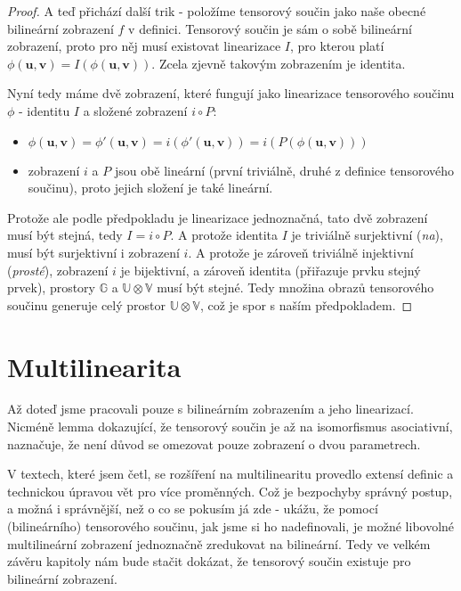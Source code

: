 \documentclass[a5paper,12pt]{amsbook}
\theoremstyle{definition}
\newcommand{\myvec}[1]{\mathbf{#1}}
\newcommand{\myspace}[1]{\mathbb{#1}}
\begin{document}
\begin{proof}
A teď přichází další trik - položíme tensorový součin jako naše obecné bilineární zobrazení
$f$ v definici. Tensorový součin je sám o sobě bilineární zobrazení, proto pro něj musí existovat
linearizace $I$, pro kterou platí $\phi(\myvec{u}, \myvec{v}) = I(\phi(\myvec{u}, \myvec{v}))$.
Zcela zjevně takovým zobrazením je identita.

Nyní tedy máme dvě zobrazení, které fungují jako linearizace tensorového součinu $\phi$ - identitu
$I$ a složené zobrazení $i \circ P$:
\begin{itemize}
\item $\phi(\myvec{u}, \myvec{v}) = \phi'(\myvec{u}, \myvec{v}) = i(\phi'(\myvec{u}, \myvec{v}))
    = i(P(\phi(\myvec{u}, \myvec{v})))$
\item zobrazení $i$ a $P$ jsou obě lineární (první triviálně, druhé z definice tensorového součinu),
    proto jejich složení je také lineární.
\end{itemize}
Protože ale podle předpokladu je linearizace jednoznačná, tato dvě zobrazení musí být stejná,
tedy $I = i \circ P$. A protože identita $I$ je triviálně surjektivní (\textit{na}), musí být
surjektivní i zobrazení $i$. A protože je zároveň triviálně injektivní (\textit{prosté}), zobrazení
$i$ je bijektivní, a zároveň identita (přiřazuje prvku stejný prvek), prostory $\myspace{G}$
a $\myspace{U}\otimes\myspace{V}$ musí být stejné. Tedy množina obrazů tensorového součinu generuje
celý prostor $\myspace{U}\otimes\myspace{V}$, což je spor s naším předpokladem.
\end{proof}

\section{Multilinearita}

\noindent
Až doteď jsme pracovali pouze s bilineárním zobrazením a jeho linearizací. Nicméně lemma dokazující, že
tensorový součin je až na isomorfismus asociativní, naznačuje, že není důvod se omezovat pouze zobrazení
o dvou parametrech.

V textech, které jsem četl, se rozšíření na multilinearitu provedlo extensí definic a technickou
úpravou vět pro více proměnných. Což je bezpochyby správný postup, a možná i správnější, než o co
se pokusím já zde - ukážu, že pomocí (bilineárního) tensorového součinu, jak jsme si ho nadefinovali,
je možné libovolné multilineární zobrazení jednoznačně zredukovat na bilineární. Tedy ve velkém závěru
kapitoly nám bude stačit dokázat, že tensorový součin existuje pro bilineární zobrazení.
\end{document}
